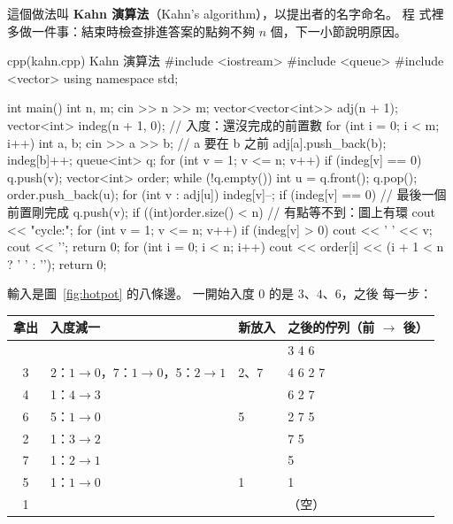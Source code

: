 這個做法叫 \textbf{Kahn 演算法}（Kahn's algorithm），以提出者的名字命名。 程
式裡多做一件事：結束時檢查排進答案的點夠不夠 $n$ 個，下一小節說明原因。

\begin{example}[label=ex:kahn]{cpp}{(kahn.cpp) Kahn 演算法}
#include <iostream>
#include <queue>
#include <vector>
using namespace std;

int main() {
    int n, m;
    cin >> n >> m;
    vector<vector<int>> adj(n + 1);
    vector<int> indeg(n + 1, 0);           // 入度：還沒完成的前置數
    for (int i = 0; i < m; i++) {
        int a, b;
        cin >> a >> b;                     // a 要在 b 之前
        adj[a].push_back(b);
        indeg[b]++;
    }
    queue<int> q;
    for (int v = 1; v <= n; v++) {
        if (indeg[v] == 0) {
            q.push(v);
        }
    }
    vector<int> order;
    while (!q.empty()) {
        int u = q.front();
        q.pop();
        order.push_back(u);
        for (int v : adj[u]) {
            indeg[v]--;
            if (indeg[v] == 0) {           // 最後一個前置剛完成
                q.push(v);
            }
        }
    }
    if ((int)order.size() < n) {           // 有點等不到：圖上有環
        cout << "cycle:";
        for (int v = 1; v <= n; v++) {
            if (indeg[v] > 0) {
                cout << ' ' << v;
            }
        }
        cout << '\n';
        return 0;
    }
    for (int i = 0; i < n; i++) {
        cout << order[i] << (i + 1 < n ? ' ' : '\n');
    }
    return 0;
}
\end{example}


輸入是圖~\ref{fig:hotpot} 的八條邊。 一開始入度 $0$ 的是 $3$、$4$、$6$，之後
每一步：

\begin{center}
\begin{tabular}{clll}
\toprule
拿出 & 入度減一 & 新放入 & 之後的佇列（前 $\to$ 後） \\
\midrule
 & & & 3 4 6 \\
3 & 2：$1 \to 0$，7：$1 \to 0$，5：$2 \to 1$ & 2、7 & 4 6 2 7 \\
4 & 1：$4 \to 3$ & & 6 2 7 \\
6 & 5：$1 \to 0$ & 5 & 2 7 5 \\
2 & 1：$3 \to 2$ & & 7 5 \\
7 & 1：$2 \to 1$ & & 5 \\
5 & 1：$1 \to 0$ & 1 & 1 \\
1 & & & （空）\\
\bottomrule
\end{tabular}
\end{center}

